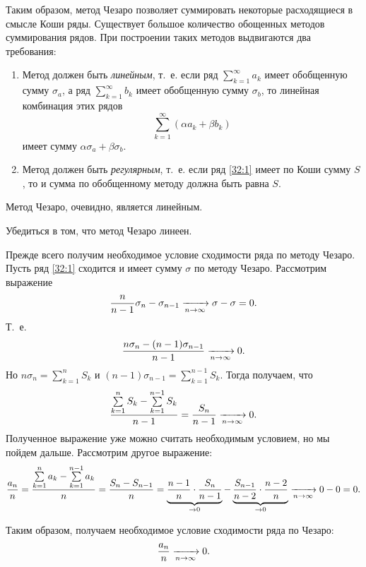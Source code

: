\documentclass[../../main.tex]{subfiles}
\begin{document}
Таким образом, метод Чезаро позволяет суммировать некоторые расходящиеся в 
смысле Коши ряды. Существует большое количество обощенных методов суммирования 
рядов. При построении таких методов выдвигаются два требования:
\begin{enumerate}
 \item Метод должен быть \emph{линейным}, т.~е. если ряд 
 $\sum\limits_{k=1}^\infty a_k$ имеет обобщенную сумму $\sigma_a$, а ряд 
 $\sum\limits_{k=1}^\infty b_k$ имеет обобщенную сумму $\sigma_b$, то линейная 
 комбинация этих рядов \[\sum\limits_{k=1}^\infty (\alpha a_k + \beta b_k)\] 
 имеет сумму $\alpha\sigma_a + \beta\sigma_b$.
 \item Метод должен быть \emph{регулярным}, т.~е. если ряд \eqref{32:1} имеет 
 по Коши сумму $S$, то и сумма по обобщенному методу должна быть равна $S$.
\end{enumerate}

Метод Чезаро, очевидно, является линейным.

\begin{exc}
 Убедиться в том, что метод Чезаро линеен.
\end{exc}

Прежде всего получим необходимое условие сходимости ряда по методу Чезаро. 
Пусть ряд \eqref{32:1} сходится и имеет сумму $\sigma$ по методу Чезаро. 
Рассмотрим выражение
\[\frac{n}{n-1}\sigma_n - \sigma_{n-1} \xrightarrow[n\to\infty]{} \sigma - \sigma = 
0.\] Т.~е. \[\frac{n\sigma_n - (n-1)\sigma_{n-1}}{n-1} \xrightarrow[n\to\infty]{} 0.\] 
Но $n\sigma_n = \sum\limits_{k=1}^n S_k$ и $(n-1)\sigma_{n-1} = 
\sum\limits_{k=1}^{n-1} S_k$. Тогда получаем, что
\[\frac{\sum\limits_{k=1}^n S_k - \sum\limits_{k=1}^{n-1} S_k}{n-1} = 
\frac{S_n}{n-1} \xrightarrow[n\to\infty]{} 0.\]
Полученное выражение уже можно считать необходимым условием, но мы пойдем 
дальше. Рассмотрим другое выражение: \[\frac{a_n}n = \frac{\sum\limits_{k=1}^n 
a_k - \sum\limits_{k=1}^{n-1} a_k}n = \frac{S_n - S_{n-1}}n  = 
\underbrace{\frac{n-1}n\cdot\frac{S_n}{n-1}}_{\to0} - 
\underbrace{\frac{S_{n-1}}{n-2}\cdot\frac{n-2}n}_{\to0} \xrightarrow[n\to\infty]{} 0-0 
= 0.\]

Таким образом, получаем необходимое условие сходимости ряда по Чезаро: 
\[\frac{a_n}n \xrightarrow[n\to\infty]{} 0.\]
\end{document}
